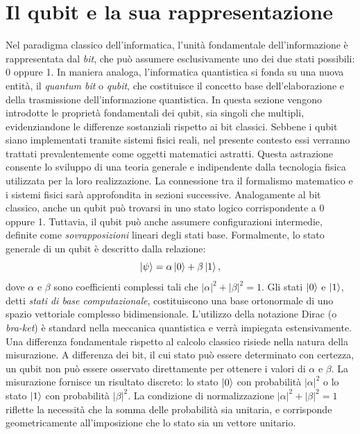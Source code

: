 \documentclass[a4paper,12pt]{report}
\theoremstyle{plain}
\begin{document}
\section{Il qubit e la sua rappresentazione}
Nel paradigma classico dell'informatica, l'unità fondamentale dell'informazione è rappresentata dal \textit{bit}, che può assumere esclusivamente uno dei due stati possibili: 0 oppure 1. In maniera analoga, l'informatica quantistica si fonda su una nuova entità, il \textit{quantum bit} o \textit{qubit}, che costituisce il concetto base dell'elaborazione e della trasmissione dell'informazione quantistica. In questa sezione vengono introdotte le proprietà fondamentali dei qubit, sia singoli che multipli, evidenziandone le differenze sostanziali rispetto ai bit classici.
Sebbene i qubit siano implementati tramite sistemi fisici reali, nel presente contesto essi verranno trattati prevalentemente come oggetti matematici astratti. Questa astrazione consente lo sviluppo di una teoria generale e indipendente dalla tecnologia fisica utilizzata per la loro realizzazione. La connessione tra il formalismo matematico e i sistemi fisici sarà approfondita in sezioni successive.
Analogamente al bit classico, anche un qubit può trovarsi in uno stato logico corrispondente a 0 oppure 1. Tuttavia, il qubit può anche assumere configurazioni intermedie, definite come \textit{sovrapposizioni} lineari degli stati base. Formalmente, lo stato generale di un qubit è descritto dalla relazione:
\begin{equation*}
\ket{\psi} = \alpha \ket{0} + \beta \ket{1},
\end{equation*}
dove $\alpha$ e $\beta$ sono coefficienti complessi tali che $|\alpha|^2 + |\beta|^2 = 1$. Gli stati $\ket{0}$ e $\ket{1}$, detti \textit{stati di base computazionale}, costituiscono una base ortonormale di uno spazio vettoriale complesso bidimensionale. L'utilizzo della notazione Dirac (o \textit{bra-ket}) è standard nella meccanica quantistica e verrà impiegata estensivamente.
Una differenza fondamentale rispetto al calcolo classico risiede nella natura della misurazione. A differenza dei bit, il cui stato può essere determinato con certezza, un qubit non può essere osservato direttamente per ottenere i valori di $\alpha$ e $\beta$. La misurazione fornisce un risultato discreto: lo stato $\ket{0}$ con probabilità $|\alpha|^2$ o lo stato $\ket{1}$ con probabilità $|\beta|^2$. La condizione di normalizzazione $|\alpha|^2 + |\beta|^2 = 1$ riflette la necessità che la somma delle probabilità sia unitaria, e corrisponde geometricamente all'imposizione che lo stato sia un vettore unitario.
\end{document}
